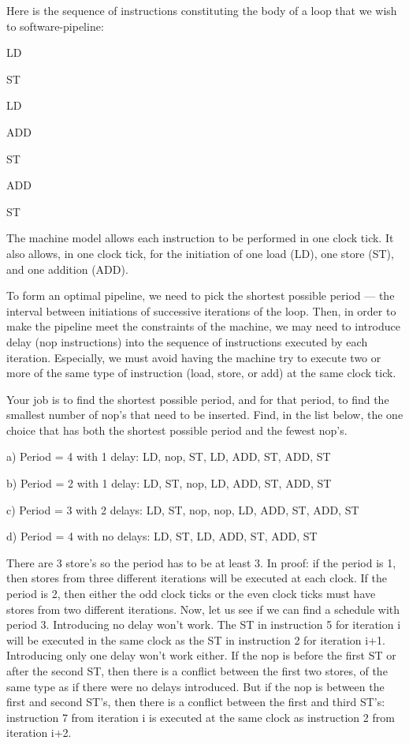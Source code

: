 


\begin{problem}
Here is the sequence of instructions constituting the body of a loop that we wish to software-pipeline:

\item LD
\item ST
\item LD
\item ADD
\item ST
\item ADD
\item ST

The machine model allows each instruction to be performed in one clock tick. It also allows, in one clock tick, for the initiation of one load (LD), one store (ST), and one addition (ADD).

To form an optimal pipeline, we need to pick the shortest possible period --- the interval between initiations of successive iterations of the loop. Then, in order to make the pipeline meet the constraints of the machine, we may need to introduce delay (nop instructions) into the sequence of instructions executed by each iteration. Especially, we must avoid having the machine try to execute two or more of the same type of instruction (load, store, or add) at the same clock tick.

Your job is to find the shortest possible period, and for that period, to find the smallest number of nop's that need to be inserted. Find, in the list below, the one choice that has both the shortest possible period and the fewest nop's.

 
\item   a) 	Period = 4 with 1 delay: LD, nop, ST, LD, ADD, ST, ADD, ST
\item  	b) 	Period = 2 with 1 delay: LD, ST, nop, LD, ADD, ST, ADD, ST
\item  	c) 	Period = 3 with 2 delays: LD, ST, nop, nop, LD, ADD, ST, ADD, ST
\item  	d) 	Period = 4 with no delays: LD, ST, LD, ADD, ST, ADD, ST


{\color{red}

There are 3 store's so the period has to be at least 3. In proof: if the period is 1, then stores from three different iterations will be executed at each clock. If the period is 2, then either the odd clock ticks or the even clock ticks must have stores from two different iterations.
Now, let us see if we can find a schedule with period 3. Introducing no delay won't work. The ST in instruction 5 for iteration i will be executed in the same clock as the ST in instruction 2 for iteration i+1. Introducing only one delay won't work either. If the nop is before the first ST or after the second ST, then there is a conflict between the first two stores, of the same type as if there were no delays introduced. But if the nop is between the first and second ST's, then there is a conflict between the first and third ST's: instruction 7 from iteration i is executed at the same clock as instruction 2 from iteration i+2.

}
\end{problem}
